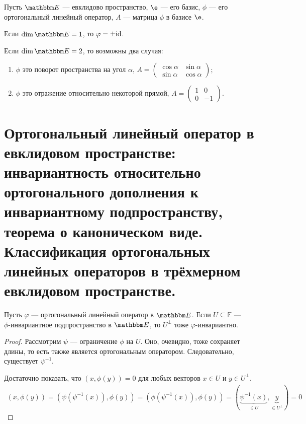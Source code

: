 Пусть $\E$ --- евклидово пространство, $\e$ --- его базис, $\phi$ --- его ортогональный линейный оператор, $A$ --- матрица $\phi$ в базисе $\e$.

Если $\dim \E = 1$, то $\varphi = \pm \mathrm{id}$.

Если $\dim \E = 2$, то возможны два случая:
\begin{enumerate}
\item $\phi$ это поворот пространства на угол $\alpha$, $A = \begin{pmatrix}
\cos\alpha & \sin\alpha \\
\sin\alpha & \cos\alpha
\end{pmatrix}$;
\item $\phi$ это отражение относительно некоторой прямой, $A = \begin{pmatrix}
1 & 0 \\
0 & -1
\end{pmatrix}$.
\end{enumerate} 

\section{Ортогональный линейный оператор в евклидовом пространстве: инвариантность относительно ортогонального дополнения к инвариантному подпространству, теорема о каноническом виде. Классификация ортогональных линейных операторов в трёхмерном евклидовом пространстве.}

\begin{Suggestion}
	Пусть $\varphi$ --- ортогональный линейный оператор в $\E$. Если $U \subseteq \mathbb{E}$ ---\\ $\phi$-инвариантное подпространство в $\E$, то $U^\perp$ тоже $\varphi$-инвариантно.
\end{Suggestion}

\begin{proof}
Рассмотрим $\psi$ --- ограничение $\phi$ на $U$. Оно, очевидно, тоже сохраняет длины, то есть также является ортогональным оператором. Следовательно, существует $\psi^{-1}$.

Достаточно показать, что $(x, \phi(y)) = 0$ для любых векторов $x \in U$ и $y \in U^\perp$.
\begin{gather*}
(x, \phi(y)) = (\psi(\psi^{-1}(x)), \phi(y)) = (\phi(\psi^{-1}(x)), \phi(y)) = (\underbrace{\psi^{-1}(x)}_{\in U}, \underbrace{y}_{\in U^\perp}) = 0
\end{gather*}
\end{proof}

